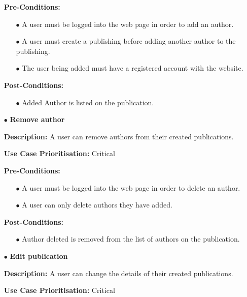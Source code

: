 \documentclass[a4paper,12pt]{article}
\begin{document}
\begin{itemize}
		\textbf{Pre-Conditions:}
		\begin{itemize}
			\item[$\bullet$]A user must be logged into the web page in order to add an author.
			\item[$\bullet$]A user must create a publishing before adding another author to the publishing.
			\item[$\bullet$]The user being added must have a registered account with the website.
			\\
		\end{itemize}
		\textbf{Post-Conditions: }
		\begin{itemize}
			\item[$\bullet$]Added Author is listed on the publication.
			\\
		\end{itemize}
		\newpage
		\item[$\bullet$]\textbf{Remove author}\newline
	
		\textbf{Description:} A user can remove authors from their created publications.\newline
	
		\textbf{Use Case Prioritisation:} Critical\newline

		\textbf{Pre-Conditions:}
		\begin{itemize}
			\item[$\bullet$]A user must be logged into the web page in order to delete an author.
			\item[$\bullet$]A user can only delete authors they have added.
			\\
		\end{itemize}
		\textbf{Post-Conditions: }	
		\begin{itemize}
			\item[$\bullet$]Author deleted is removed from the list of authors on the publication.
			\\
		\end{itemize}
		\item[$\bullet$]\textbf{Edit publication}\newline

		\textbf{Description:} A user can change the details of their created publications.\newline
	
		\textbf{Use Case Prioritisation:} Critical\newline


\end{itemize}
\end{document}
